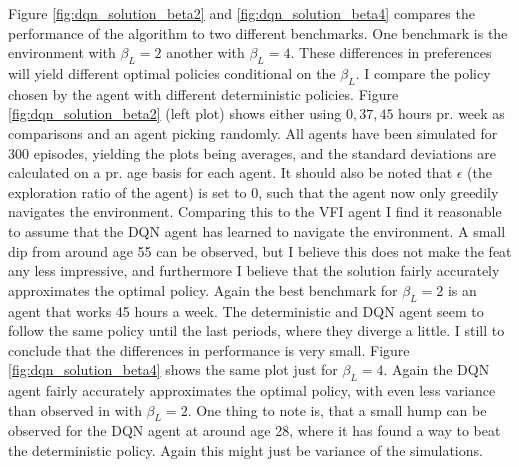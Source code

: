 Figure \ref{fig:dqn_solution_beta2} and \ref{fig:dqn_solution_beta4} compares the performance of the algorithm to two different benchmarks. One benchmark is the environment with $\beta_L = 2$ another with $\beta_L=4$. These differences in preferences will yield different optimal policies conditional on the $\beta_L$. I compare the policy chosen by the agent with different deterministic policies. Figure \ref{fig:dqn_solution_beta2} (left plot) shows either using $0, 37, 45$ hours pr. week as comparisons and an agent picking randomly. All agents have been simulated for 300 episodes, yielding the plots being averages, and the standard deviations are calculated on a pr. age basis for each agent. It should also be noted that $\epsilon$ (the exploration ratio of the agent) is set to 0, such that the agent now only greedily navigates the environment. Comparing this to the VFI agent I find  it reasonable to assume that the DQN agent has learned to navigate the environment. A small dip from around age 55 can be observed, but I believe this does not make the feat any less impressive, and furthermore I believe that the solution fairly accurately approximates the optimal policy. Again the best benchmark for $\beta_L = 2$ is an agent that works 45 hours a week. The deterministic and DQN agent seem to follow the same policy until  the last periods, where they diverge a little. I still to conclude that the differences in performance is very small. Figure \ref{fig:dqn_solution_beta4} shows the same plot just for $\beta_L = 4$. Again the DQN agent fairly accurately approximates the optimal policy, with even less variance than observed in with $\beta_L = 2$. One thing to note is, that a small hump can be observed for the DQN agent at around age 28, where it has found a way to beat the deterministic policy. Again this might just be variance of the simulations. 


